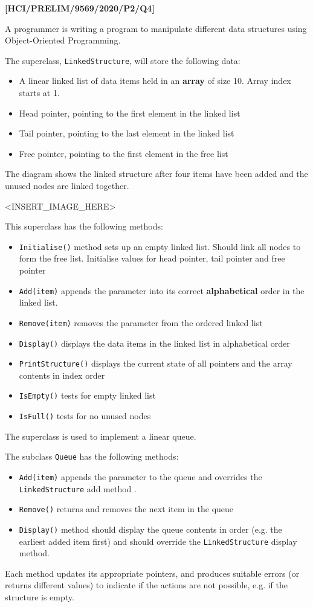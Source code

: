 \item \textbf{{[}HCI/PRELIM/9569/2020/P2/Q4{]} }

A programmer is writing a program to manipulate different data structures
using Object-Oriented Programming. 

The superclass, \texttt{LinkedStructure}, will store the following
data:
\begin{itemize}
\item A linear linked list of data items held in an \textbf{array} of size
10. Array index starts at 1. 
\item Head pointer, pointing to the first element in the linked list 
\item Tail pointer, pointing to the last element in the linked list 
\item Free pointer, pointing to the first element in the free list
\end{itemize}
The diagram shows the linked structure after four items have been
added and the unused nodes are linked together. 
\noindent \begin{center}
<INSERT\_IMAGE\_HERE>
\par\end{center}

This superclass has the following methods:
\begin{itemize}
\item \texttt{Initialise()} method sets up an empty linked list. Should
link all nodes to form the free list. Initialise values for head pointer,
tail pointer and free pointer 
\item \texttt{Add(item)} appends the parameter into its correct \textbf{alphabetical}
order in the linked list. 
\item \texttt{Remove(item)} removes the parameter from the ordered linked
list 
\item \texttt{Display()} displays the data items in the linked list in alphabetical
order 
\item \texttt{PrintStructure()} displays the current state of all pointers
and the array contents in index order 
\item \texttt{IsEmpty()} tests for empty linked list 
\item \texttt{IsFull()} tests for no unused nodes
\end{itemize}
The superclass is used to implement a linear queue. 

The subclass \texttt{Queue} has the following methods:
\begin{itemize}
\item \texttt{Add(item)} appends the parameter to the queue and overrides
the \texttt{LinkedStructure} add method . 
\item \texttt{Remove()} returns and removes the next item in the queue
\item \texttt{Display()} method should display the queue contents in order
(e.g. the earliest added item first) and should override the \texttt{LinkedStructure}
display method. 
\end{itemize}
Each method updates its appropriate pointers, and produces suitable
errors (or returns different values) to indicate if the actions are
not possible, e.g. if the structure is empty. 

